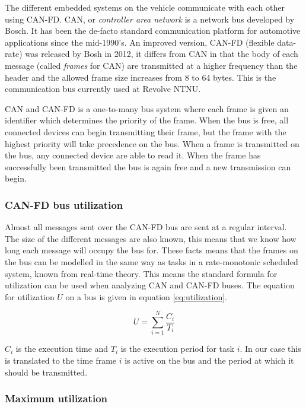 The different embedded systems on the vehicle communicate with each other using CAN-FD. CAN, or \emph{controller area network} is a network bus developed by Bosch. It has been the de-facto standard communication platform for automotive applications since the mid-1990's. An improved version, CAN-FD (flexible data-rate) was released by Bosh in 2012, it differs from CAN in that the body of each message (called \emph{frames} for CAN) are transmitted at a higher frequency than the header and the allowed frame size increases from 8 to 64 bytes. This is the communication bus currently used at Revolve NTNU.

CAN and CAN-FD is a one-to-many bus system where each frame is given an identifier which determines the priority of the frame. When the bus is free, all connected devices can begin transmitting their frame, but the frame with the highest priority will take precedence on the bus. When a frame is transmitted on the bus, any connected device are able to read it. When the frame has successfully been transmitted the bus is again free and a new transmission can begin.

\subsubsection{CAN-FD bus utilization}

Almost all messages sent over the CAN-FD bus are sent at a regular interval. The size of the different messages are also known, this means that we know how long each message will occupy the bus for. These facts means that the frames on the bus can be modelled in the same way as tasks in a rate-monotonic scheduled system, known from real-time theory. This means the standard formula for utilization can be used when analyzing CAN and CAN-FD buses. The equation for utilization $U$ on a bus is given in equation \ref{eq:utilization}. 

\begin{equation}
    U=\sum_{i=1}^N\frac{C_i}{T_i}
    \label{eq:utilization}
\end{equation}

$C_i$ is the execution time and $T_i$ is the execution period for task $i$. In our case this is translated to the time frame $i$ is active on the bus and the period at which it should be transmitted. 


\subsubsection{Maximum utilization}

